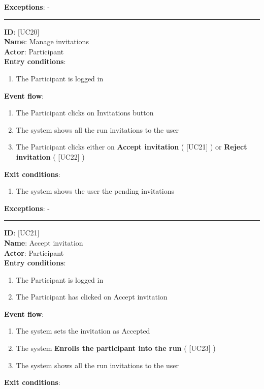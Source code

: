 \documentclass[12pt]{article}
\newcommand\usecase[1]{ [UC#1] }
\begin{document}
\begin{itemize}
\begin{enumerate}
  		\end{enumerate}
  	\textbf{Exceptions}: - \\
  	\rule{\linewidth}{0.4pt}
  	\textbf{ID}: \usecase{20} \\
  	\textbf{Name}: Manage invitations \\
    \textbf{Actor}: Participant \\
    \textbf{Entry conditions}: 
    		\begin{enumerate}
    			\item{The Participant is logged in}
    		\end{enumerate}
  	\textbf{Event flow}:
  		\begin{enumerate}
    			\item{The Participant clicks on Invitations button}
    			\item{The system shows all the run invitations to the user}
    			\item{The Participant clicks either on \textbf{Accept invitation} (\usecase{21}) or \textbf{Reject invitation} (\usecase{22})}
  		\end{enumerate}
  	\textbf{Exit conditions}:
  		\begin{enumerate}
    			\item{The system shows the user the pending invitations}
  		\end{enumerate}
  	\textbf{Exceptions}: - \\
  	\rule{\linewidth}{0.4pt}
  	\textbf{ID}: \usecase{21} \\
  	\textbf{Name}: Accept invitation \\
    \textbf{Actor}: Participant \\
    \textbf{Entry conditions}: 
    		\begin{enumerate}
    			\item{The Participant is logged in}
    			\item{The Participant has clicked on Accept invitation}
    		\end{enumerate}
  	\textbf{Event flow}:
  		\begin{enumerate}
    			\item{The system sets the invitation as Accepted}
    			\item{The system \textbf{Enrolls the participant into the run} (\usecase{23})}
    			\item{The system shows all the run invitations to the user}
  		\end{enumerate}
  	\textbf{Exit conditions}:
  		\begin{enumerate}

\end{enumerate}
\end{itemize}
\end{document}
